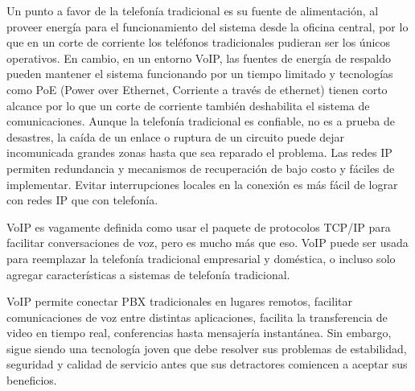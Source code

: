 	Un punto a favor de la telefonía tradicional es su fuente de alimentación, al proveer energía para el funcionamiento del sistema desde la oficina central, por lo que en un corte de corriente los teléfonos tradicionales pudieran ser los únicos operativos. En cambio, en un entorno VoIP, las fuentes de energía 
	de respaldo pueden mantener el sistema funcionando por un tiempo limitado y  tecnologías como PoE (Power over Ethernet, Corriente a través de ethernet) tienen corto alcance por lo que un corte de corriente también deshabilita el sistema de comunicaciones. Aunque la telefonía tradicional es confiable, no es a prueba de desastres, la caída de un enlace o ruptura de un circuito 
	puede dejar incomunicada grandes zonas hasta que sea reparado el problema. Las redes IP permiten redundancia y mecanismos de recuperación de bajo costo y fáciles de implementar. Evitar interrupciones locales en la conexión es más fácil de lograr con redes IP que con telefonía. 
	  
	VoIP es vagamente definida como usar el paquete de protocolos TCP/IP para facilitar conversaciones de voz, pero es mucho más que eso. VoIP puede ser usada para reemplazar la telefonía tradicional empresarial y doméstica, o incluso solo agregar características a sistemas de telefonía tradicional. 
	
	VoIP permite conectar PBX tradicionales en lugares remotos, facilitar comunicaciones de voz entre distintas aplicaciones, facilita la transferencia de video en tiempo real, conferencias hasta mensajería instantánea. Sin embargo, sigue siendo una 
	tecnología joven que debe resolver sus problemas de estabilidad, seguridad y calidad de servicio antes que sus detractores comiencen a aceptar sus beneficios.